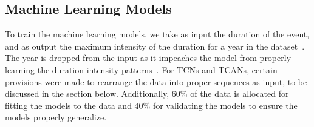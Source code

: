 \subsection{Machine Learning Models}
To train the machine learning models, we take as input the duration of the event, and as output the maximum intensity of the duration for a year in the dataset~\cite{idfkoya}. The year is dropped from the input as it impeaches the model from properly learning the duration-intensity patterns~\cite{idfkoya}. For TCNs and TCANs, certain provisions were made to rearrange the data into proper sequences as input, to be discussed in the section below. Additionally, 60\% of the data is allocated for fitting the models to the data and 40\% for validating the models to ensure the models properly generalize.